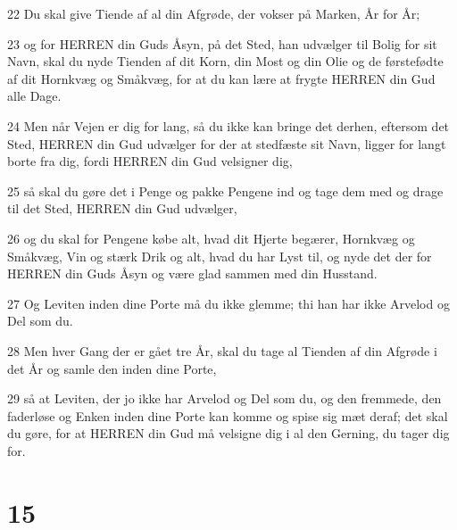 \par 22 Du skal give Tiende af al din Afgrøde, der vokser på Marken, År for År;
\par 23 og for HERREN din Guds Åsyn, på det Sted, han udvælger til Bolig for sit Navn, skal du nyde Tienden af dit Korn, din Most og din Olie og de førstefødte af dit Hornkvæg og Småkvæg, for at du kan lære at frygte HERREN din Gud alle Dage.
\par 24 Men når Vejen er dig for lang, så du ikke kan bringe det derhen, eftersom det Sted, HERREN din Gud udvælger for der at stedfæste sit Navn, ligger for langt borte fra dig, fordi HERREN din Gud velsigner dig,
\par 25 så skal du gøre det i Penge og pakke Pengene ind og tage dem med og drage til det Sted, HERREN din Gud udvælger,
\par 26 og du skal for Pengene købe alt, hvad dit Hjerte begærer, Hornkvæg og Småkvæg, Vin og stærk Drik og alt, hvad du har Lyst til, og nyde det der for HERREN din Guds Åsyn og være glad sammen med din Husstand.
\par 27 Og Leviten inden dine Porte må du ikke glemme; thi han har ikke Arvelod og Del som du.
\par 28 Men hver Gang der er gået tre År, skal du tage al Tienden af din Afgrøde i det År og samle den inden dine Porte,
\par 29 så at Leviten, der jo ikke har Arvelod og Del som du, og den fremmede, den faderløse og Enken inden dine Porte kan komme og spise sig mæt deraf; det skal du gøre, for at HERREN din Gud må velsigne dig i al den Gerning, du tager dig for.

\chapter{15}

